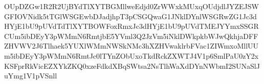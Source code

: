 OUpDZGw1R2R2UjBYdTlXYTBGMllweEdjd0ZrWWxkMUxqOUdjdlJYZEJSWGFIOVNidk5tTGlWSGEwbDJadjhpT3pCSGQwaG1JNklDYnlWSGRwZG1Jc3dHYjE1bU9pUVdTdTlXYTBOWFoxRmxJc3dHYjE1bU9pUVdTMEJYYmxSSGRCUm5ibDEyY3pWMmN6RmtjbE5YVml3Q2JzVm5iNklDWkpkbWJwQkhjaDFFZHVWV2J6Tlhaek5YUXlWMmNWSkNMc3hXZHVwaklrbFVac1ZIWmxoMllUUm5ibDEyY3pWMmN6RmtJc0lTYnZObUxoTkdRckZXWTJ4V1p6SmlPaU0zY2xKSFprRkVicEZXYkZKQ0xzeFdkdXBqSWtsa2NsTlhWaXdDYnNWbmI2SUNaSlJuYmg1V1pVSnll